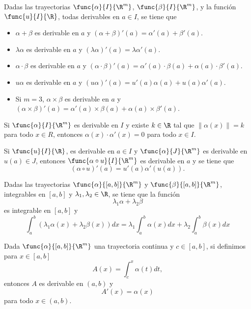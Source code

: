 \documentclass[a4,11pt]{aleph-notas}
\begin{document}
\begin{teo}
    Dadas las trayectorias $\func{\alpha}{I}{\R^m}$, $\func{\beta}{I}{\R^m}$, y la función $\func{u}{I}{\R}$, todas derivables en $a\in I$, se tiene que
    \begin{itemize}
        \item $\alpha+\beta$ es derivable en $a$ y $(\alpha+\beta)'(a)=\alpha'(a)+\beta'(a)$.
        \item $\lambda \alpha$ es derivable en $a$ y $(\lambda \alpha)'(a)=\lambda \alpha'(a)$.
        \item $\alpha \cdot \beta$ es derivable en $a$ y $(\alpha \cdot \beta)'(a)=\alpha'(a)\cdot \beta(a)+\alpha(a)\cdot \beta'(a)$.
        \item $u \alpha$ es derivable en $a$ y $(u \alpha)'(a)=u'(a) \alpha(a)+u(a) \alpha'(a)$.
        \item Si $m=3$, $\alpha \times \beta$ es derivable en $a$ y $(\alpha \times \beta)'(a)=\alpha'(a)\times \beta(a)+\alpha(a)\times \beta'(a)$.
    \end{itemize}
\end{teo}

\begin{prop}
    Si $\func{\alpha}{I}{\R^m}$ es derivable en $I$ y existe $k\in\R$ tal que $\|\alpha(x)\|=k$ para todo $x\in R$, entonces $\alpha(x)\cdot \alpha'(x)=0$ para todo $x\in I$.
\end{prop}

\begin{teo}
    Si $\func{u}{I}{\R}$, es derivable en $a\in I$ y $\func{\alpha}{J}{\R^m}$ es derivable en $u(a)\in J$, entonces $\func{\alpha\circ u}{I}{\R^m}$ es derivable en $a$ y se tiene que
    \[
        (\alpha\circ u)'(a)=u'(a)\alpha'(u(a)).
    \]
\end{teo}

\begin{prop}
    Dadas las trayectorias $\func{\alpha}{[a,b]}{\R^m}$ y $\func{\beta}{[a,b]}{\R^m}$, integrables en $[a,b]$ y $\lambda_1,\lambda_2\in\R$, se tiene que la función
    \[
        \lambda_1 \alpha + \lambda_2 \beta
    \]
    es integrable en $[a,b]$ y
    \[
        \int_a^b(\lambda_1 \alpha(x) + \lambda_2 \beta(x) )dx
        = \lambda_1\int_a^b \alpha(x)dx + \lambda_2 \int_a^b \beta(x) dx
    \]
\end{prop}

\begin{teo}
    Dada $\func{\alpha}{[a,b]}{\R^m}$ una trayectoria continua y $c\in[a,b]$, si definimos para $x\in[a,b]$
    \[
        A(x)=\int_c^x \alpha(t) dt,
    \]
    entonces $A$ es derivable en $(a,b)$ y 
    \[
        A'(x)=\alpha(x)
    \]
    para todo $x\in(a,b)$.
\end{teo}
\end{document}
